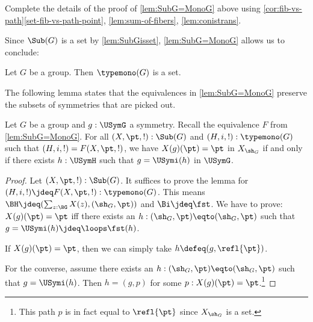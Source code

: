 \begin{xca}\label{xca:SubG=MonoG}
Complete the details of the proof of \cref{lem:SubG=MonoG} above using 
\cref{cor:fib-vs-path}\ref{set-fib-vs-path-point},
\cref{lem:sum-of-fibers},
\cref{lem:conistrans}.
\end{xca}

Since $\Sub(G)$ is a set by \cref{lem:SubGisset}, 
\cref{lem:SubG=MonoG} allows us to conclude:

\begin{corollary}\label{lem:setofsubgroups}
Let $G$ be a group. Then $\typemono(G)$ is a set.
\end{corollary}

The following lemma states that the equivalences in \cref{lem:SubG=MonoG} preserve the subsets of symmetries that are picked out.
\begin{lemma}\label{lem:E-preserves-symms}
  Let $G$ be a group and $g:\USymG$ a symmetry.
  Recall the equivalence $F$ from \cref{lem:SubG=MonoG}.
  For all $(X,\pt,!) : \Sub(G)$ and $(H,i,!) : \typemono(G)$
  such that $(H,i,!)=F(X,\pt,!)$,
  we have $X(g)(\pt) = \pt$ in $X_{\sh_G}$ if and only if 
  there exists $h:\USymH$ such that $g = \USymi(h)$ in $\USymG$.
\end{lemma}
\begin{proof}
Let $(X,\pt,!):\Sub(G)$. It suffices to prove the lemma for 
$(H,i,!)\jdeq F(X,\pt,!) : \typemono(G)$.
This means $\BH\jdeq(\sum_{z:\BG}X(z),(\sh_G,\pt))$ and $\Bi\jdeq\fst$.
We have to prove: $X(g)(\pt)=\pt$ iff there exists an
$h:(\sh_G,\pt)\eqto(\sh_G,\pt)$ such that $g = \USymi(h)\jdeq\loops\fst(h)$.

If $X(g)(\pt)=\pt$, then we can simply take $h\defeq(g,\refl{\pt})$.

For the converse, assume there exists an
$h:(\sh_G,\pt)\eqto(\sh_G,\pt)$ such that $g = \USymi(h)$.
Then $h = (g,p)$ for some $p: X(g)(\pt)=\pt$.\footnote{This path $p$ is
in fact equal to $\refl{\pt}$ since $X_{\sh_G}$ is a set.}
\end{proof}

%


